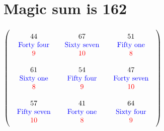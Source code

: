 \documentclass{article}
\begin{document}
\vspace{2em} 
\section{Magic sum is 162}$ \left( \begin{array}{ccc}
\begin{array}{c}
\rule{0pt}{1.5em}44 \\ 
\text{\color{blue}Forty four} \\ 
\color{red}9 \vspace{.5em} 
\end{array} & \begin{array}{c}
\rule{0pt}{1.5em}67 \\ 
\text{\color{blue}Sixty seven} \\ 
\color{red}10 \vspace{.5em} 
\end{array} & \begin{array}{c}
\rule{0pt}{1.5em}51 \\ 
\text{\color{blue}Fifty one} \\ 
\color{red}8 \vspace{.5em} 
\end{array}\\ 
\begin{array}{c}
\rule{0pt}{1.5em}61 \\ 
\text{\color{blue}Sixty one} \\ 
\color{red}8 \vspace{.5em} 
\end{array} & \begin{array}{c}
\rule{0pt}{1.5em}54 \\ 
\text{\color{blue}Fifty four} \\ 
\color{red}9 \vspace{.5em} 
\end{array} & \begin{array}{c}
\rule{0pt}{1.5em}47 \\ 
\text{\color{blue}Forty seven} \\ 
\color{red}10 \vspace{.5em} 
\end{array}\\ 
\begin{array}{c}
\rule{0pt}{1.5em}57 \\ 
\text{\color{blue}Fifty seven} \\ 
\color{red}10 \vspace{.5em} 
\end{array} & \begin{array}{c}
\rule{0pt}{1.5em}41 \\ 
\text{\color{blue}Forty one} \\ 
\color{red}8 \vspace{.5em} 
\end{array} & \begin{array}{c}
\rule{0pt}{1.5em}64 \\ 
\text{\color{blue}Sixty four} \\ 
\color{red}9 \vspace{.5em} 
\end{array}\end{array} \right) $
\end{document}
